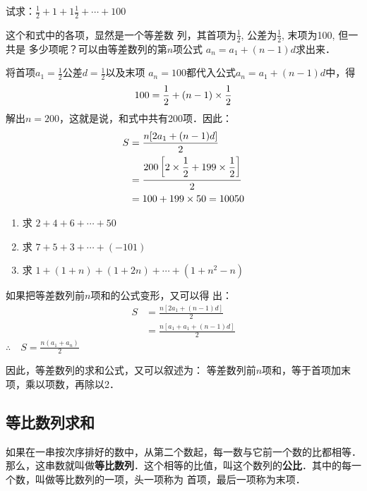 \begin{example}
    试求：$\frac{1}{2}+1+1\frac{1}{2}+\cdots+100$
\end{example}

\begin{analyze}
这个和式中的各项，显然是一个等差数
列，其首项为$\frac{1}{2}$, 公差为$\frac{1}{2}$,
末项为100, 但一共是
多少项呢？可以由等差数列的第$n$项公式 $a_n=a_1+(n-1)d$求出来．

\end{analyze}

\begin{solution}
将首项$a_1=\frac{1}{2}$公差$d=\frac{1}{2}$以及末项
$a_n=100$都代入公式$a_n=a_1+(n-1)d$中，得
\[100=\dfrac{1}{2}+(n-1)\times \dfrac{1}{2}\]
解出$n=200$，这就是说，和式中共有200项．因此：
\[\begin{split}
    S&=\dfrac{n[2a_1+(n-1)d]}{2}\\
    &=\dfrac{200\left[2\times\dfrac{1}{2}+199\times \dfrac{1}{2}\right]}{2}\\
    &=100+199\times 50=10050
\end{split}\]
\end{solution}

\begin{ex}
\begin{enumerate}
    \item 求 $2+4+6+\cdots+50$
    \item 求 $7+5+3+\cdots+(-101)$
    \item 求 $1+(1+n)+(1+2n)+\cdots+(1+n^2-n)$
\end{enumerate}
\end{ex}

如果把等差数列前$n$项和的公式变形，又可以得
出：
\[\begin{split}
    S&=\frac{n[2a_1+(n-1)d]}{2}\\
    &=\frac{n[a_1+a_1+(n-1)d]}{2}
\end{split}\]
$\therefore\quad S=\frac{n(a_1+a_n)}{2}$

因此，等差数列的求和公式，又可以叙述为：
等差数列前$n$项和，等于首项加末项，乘以项数，再除以2．

\subsection{等比数列求和}
如果在一串按次序排好的数中，从第二个数起，每一数与它前一个数的比都相等．那么，这串数就叫做\textbf{等比数列}．这个相等的比值，叫这个数列的\textbf{公比}．其中的每一个数，叫做等比数列的一项，头一项称为
首项，最后一项称为末项．

